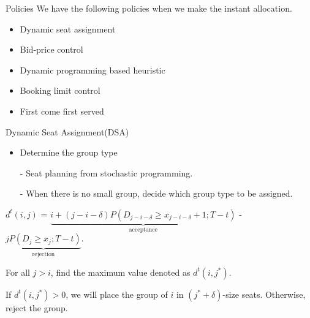     \begin{frame}{Policies}
      We have the following policies when we make the instant allocation.

      \begin{itemize}
        \item Dynamic seat assignment
        \item Bid-price control
        \item Dynamic programming based heuristic
        \item Booking limit control
        \item First come first served
      \end{itemize}
    \end{frame}

    \begin{frame}{Dynamic Seat Assignment(DSA)}
      \begin{itemize}
        \item Determine the group type
        \item[-] Seat planning from stochastic programming.
        \item[-] When there is no small group, decide which group type to be assigned.
      \end{itemize}
      \vspace*{1cm}
      \small
      $d^{t}(i, j)$ = $\underbrace{i + (j-i-\delta)P(D_{j-i-\delta} \geq x_{j-i-\delta}+1; T-t)}_{\text{acceptance}}$ - $\underbrace{j P(D_{j} \geq x_{j}; T-t)}_{\text{rejection}}.$
      \vspace*{1cm}

      For all $j > i$, find the maximum value denoted as $d^{t}(i, j^{*})$.
      
      If $d^{t}(i, j^{*}) > 0$, we will place the group of $i$ in $(j^{*} + \delta)$-size seats. Otherwise, reject the group.
    \end{frame}

